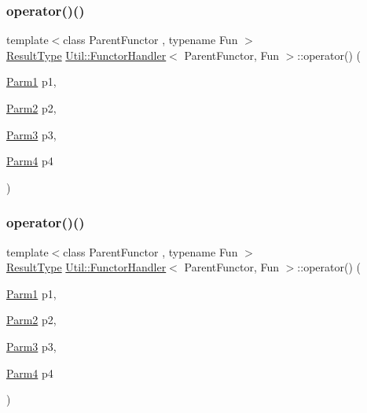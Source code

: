 \subsubsection{\texorpdfstring{operator()()}{operator()()}\hspace{0.1cm}{\footnotesize\ttfamily [9/12]}}
{\footnotesize\ttfamily template$<$class Parent\+Functor , typename Fun $>$ \\
\mbox{\hyperlink{classUtil_1_1FunctorHandler_a036da44b8cc2567704cebd2a20d16c80}{Result\+Type}} \mbox{\hyperlink{classUtil_1_1FunctorHandler}{Util\+::\+Functor\+Handler}}$<$ Parent\+Functor, Fun $>$\+::operator() (\begin{DoxyParamCaption}\item[{\mbox{\hyperlink{classUtil_1_1FunctorHandler_a0a902ba40a0ab746f1c29a81d68ae0db}{Parm1}}}]{p1,  }\item[{\mbox{\hyperlink{classUtil_1_1FunctorHandler_a5fb5374c316f8ac252aa22fcdf7d21a7}{Parm2}}}]{p2,  }\item[{\mbox{\hyperlink{classUtil_1_1FunctorHandler_a25f1b9dd7890c1dbc68abc686f30bec8}{Parm3}}}]{p3,  }\item[{\mbox{\hyperlink{classUtil_1_1FunctorHandler_a2e8ca7556b379684e9b76029e77dd644}{Parm4}}}]{p4 }\end{DoxyParamCaption})\hspace{0.3cm}{\ttfamily [inline]}}

\mbox{\label{classUtil_1_1FunctorHandler_a2d310b7fe0c60af9889d0ac218406cd9}} 
\subsubsection{\texorpdfstring{operator()()}{operator()()}\hspace{0.1cm}{\footnotesize\ttfamily [10/12]}}
{\footnotesize\ttfamily template$<$class Parent\+Functor , typename Fun $>$ \\
\mbox{\hyperlink{classUtil_1_1FunctorHandler_a036da44b8cc2567704cebd2a20d16c80}{Result\+Type}} \mbox{\hyperlink{classUtil_1_1FunctorHandler}{Util\+::\+Functor\+Handler}}$<$ Parent\+Functor, Fun $>$\+::operator() (\begin{DoxyParamCaption}\item[{\mbox{\hyperlink{classUtil_1_1FunctorHandler_a0a902ba40a0ab746f1c29a81d68ae0db}{Parm1}}}]{p1,  }\item[{\mbox{\hyperlink{classUtil_1_1FunctorHandler_a5fb5374c316f8ac252aa22fcdf7d21a7}{Parm2}}}]{p2,  }\item[{\mbox{\hyperlink{classUtil_1_1FunctorHandler_a25f1b9dd7890c1dbc68abc686f30bec8}{Parm3}}}]{p3,  }\item[{\mbox{\hyperlink{classUtil_1_1FunctorHandler_a2e8ca7556b379684e9b76029e77dd644}{Parm4}}}]{p4 }\end{DoxyParamCaption})\hspace{0.3cm}{\ttfamily [inline]}}

